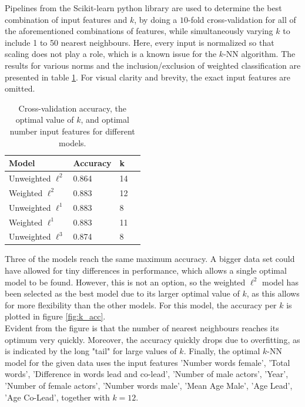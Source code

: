 \documentclass{article}
\begin{document}
\noindent Pipelines from the Scikit-learn python library are used to determine the best combination of input features and $k$, by doing a $10$-fold cross-validation for all of the aforementioned combinations of features, while simultaneously varying $k$ to include 1 to 50 nearest neighbours. Here, every input is normalized so that scaling does not play a role, which is a known issue for the $k$-NN algorithm. The results for various norms and the inclusion/exclusion of weighted classification are presented in table \ref{tab:knn}. For visual clarity and brevity, the exact input features are omitted.
\begin{table}[ht!]
    \centering
    \begin{tabular}{|l|l|l|l|}
    \hline
    Model & Accuracy &  k \\ \hline
    Unweighted $\ell^2$      &  0.864    & 14   \\
    Weighted $\ell^2$      &    0.883     &  12 \\
    Unweighted $\ell^1$      &   0.883       & 8  \\
    Weighted $\ell^1$      &   0.883       & 11  \\
    Unweighted $\ell^3$      & 0.874         & 8  \\ \hline
    \end{tabular}
    \caption{Cross-validation accuracy, the optimal value of $k$, and optimal number input features for different models.}
    \label{tab:knn}
\end{table}
\noindent Three of the models reach the same maximum accuracy. A bigger data set could have allowed for tiny differences in performance, which allows a single optimal model to be found. However, this is not an option, so the weighted $\ell^2$ model has been selected as the best model due to its larger optimal value of $k$, as this allows for more flexibility than the other models. For this model, the accuracy per $k$ is plotted in figure \ref{fig:k_acc}.  \\

\noindent Evident from the figure is that the number of nearest neighbours reaches its optimum very quickly. Moreover, the accuracy quickly drops due to overfitting, as is indicated by the long "tail" for large values of $k$. Finally, the optimal $k$-NN model for the given data uses the input features 'Number words female', 'Total words', 'Difference in words lead and co-lead', 'Number of male actors', 'Year', 'Number of female actors', 'Number words male', 'Mean Age Male', 'Age Lead', 'Age Co-Lead', together with $k=12$.
\end{document}
